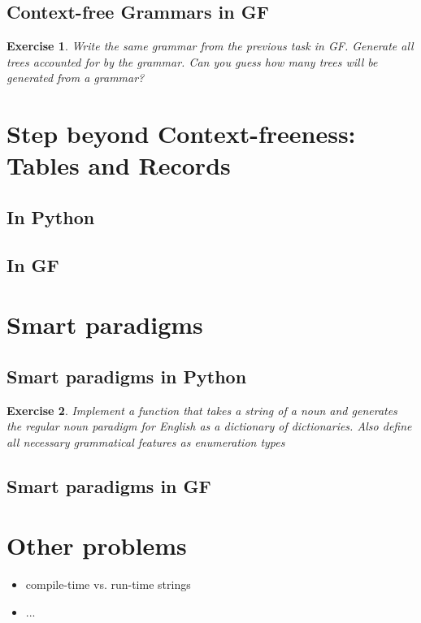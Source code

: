 \documentclass{scrartcl}
\newtheorem{exercise}{Exercise}
\begin{document}
\subsection{Context-free Grammars in GF}



\begin{exercise}
  Write the same grammar from the previous task in GF. Generate all trees accounted for by the grammar. Can you guess how many trees will be
  generated from a grammar?
\end{exercise}
\section{Step beyond Context-freeness: Tables and Records}
\subsection{In Python}
\subsection{In GF}
\section{Smart paradigms}
\subsection{Smart paradigms in Python}
\begin{exercise}
  Implement a function that takes a string of a noun and generates the regular noun paradigm for English as a dictionary of dictionaries. Also define all necessary grammatical features as enumeration types
\end{exercise}
\subsection{Smart paradigms in GF}
\section{Other problems}
\begin{itemize}
\item compile-time vs. run-time strings
\item ...
\end{itemize}
\end{document}
